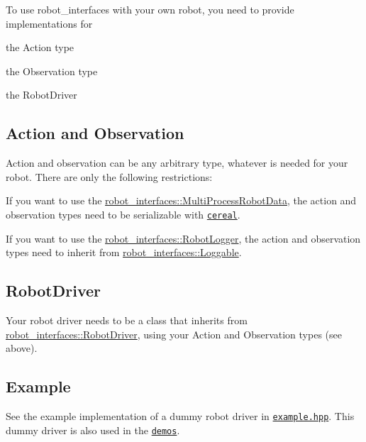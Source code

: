 To use robot\+\_\+interfaces with your own robot, you need to provide implementations for


\begin{DoxyItemize}
\item the Action type
\item the Observation type
\item the Robot\+Driver
\end{DoxyItemize}

\subsection*{Action and Observation }

Action and observation can be any arbitrary type, whatever is needed for your robot. There are only the following restrictions\+:


\begin{DoxyItemize}
\item If you want to use the \hyperlink{classrobot__interfaces_1_1MultiProcessRobotData}{robot\+\_\+interfaces\+::\+Multi\+Process\+Robot\+Data}, the action and observation types need to be serializable with \href{https://uscilab.github.io/cereal/}{\tt cereal}.
\item If you want to use the \hyperlink{classrobot__interfaces_1_1RobotLogger}{robot\+\_\+interfaces\+::\+Robot\+Logger}, the action and observation types need to inherit from \hyperlink{classrobot__interfaces_1_1Loggable}{robot\+\_\+interfaces\+::\+Loggable}.
\end{DoxyItemize}

\subsection*{Robot\+Driver }

Your robot driver needs to be a class that inherits from \hyperlink{classrobot__interfaces_1_1RobotDriver}{robot\+\_\+interfaces\+::\+Robot\+Driver}, using your {\ttfamily Action} and {\ttfamily Observation} types (see above).

\subsection*{Example }

See the example implementation of a dummy robot driver in \href{https://github.com/open-dynamic-robot-initiative/robot_interfaces/blob/master/include/robot_interfaces/example.hpp}{\tt example.\+hpp}. This dummy driver is also used in the \href{https://github.com/open-dynamic-robot-initiative/robot_interfaces/blob/master/demos}{\tt demos}. 